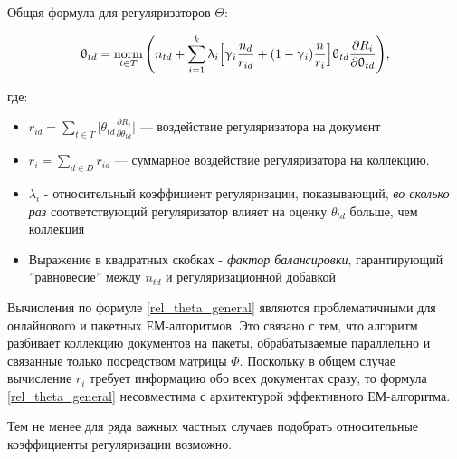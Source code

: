  

Общая формула для регуляризаторов $\Theta$: 

 

\[ 

\theta_{td} = \norm_{t \in T} \Bigg(  

    n_{td} + \sum_{i=1}^k \lambda_i \Big[ 

        \gamma_i \frac{n_d}{r_{id}} + (1-\gamma_i)\frac{n}{r_i} 

        \Big]  

    \theta_{td} \frac{\partial R_i}{\partial \theta_{td}} 

\Bigg), \label{rel_theta_general} 

\] 

 

где:  

\begin{itemize} 

    \item { $r_{id} = \sum_{t\in T} \Big | \theta_{td} \frac{\partial R_i}{\partial \theta_{td}} \Big | $ --- воздействие регуляризатора на документ} 

    \item { $r_{i} = \sum_{d\in D} r_{id}$ --- суммарное воздействие регуляризатора на коллекцию.} 

    \item { $\lambda_i$ - относительный коэффициент регуляризации, показывающий, \emph{во сколько раз} соответствующий регуляризатор влияет на оценку $\theta_{td}$ больше, чем коллекция} 

    \item {Выражение в квадратных скобках - \textit{фактор балансировки}, гарантирующий ''равновесие'' между $n_{td}$ и регуляризационной добавкой} 

\end{itemize} 

 

Вычисления по формуле \ref{rel_theta_general} являются проблематичными для онлайнового и пакетных ЕМ-алгоритмов. Это связано с тем, что алгоритм разбивает коллекцию документов на пакеты, обрабатываемые параллельно и связанные только посредством матрицы $\Phi$. Поскольку в общем случае вычисление $r_i$ требует информацию обо всех документах сразу, то формула \ref{rel_theta_general} несовместима с архитектурой эффективного ЕМ-алгоритма. 

 

Тем не менее для ряда важных частных случаев подобрать относительные коэффициенты регуляризации возможно. 

